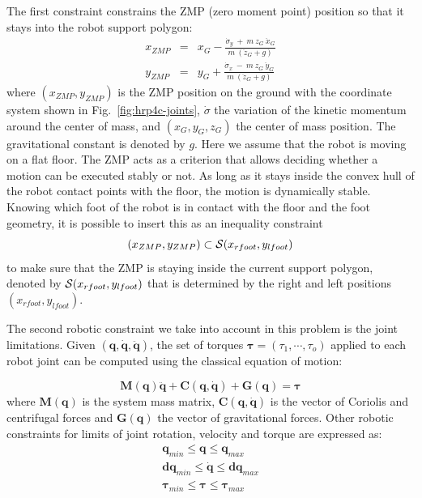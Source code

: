 \documentclass[letterpaper, 10 pt, conference]{ieeeconf}  %
\begin{document}
The first constraint constrains the ZMP (zero moment point) position
so that it stays into the robot support polygon:
\begin{equation}
  \begin{array}{ccc}
    x_{ZMP} &=& x_G - \frac{\dot{\sigma}_y\ +\ m\ z_G\ \ddot{x}_G}{m\ (\ddot{z}_G + g)} \\
    y_{ZMP} &=& y_G + \frac{\dot{\sigma}_x\ -\ m\ z_G\ \ddot{y}_G}{m\ (\ddot{z}_G + g)}
    \end{array}
\label{eq:zmp}
\end{equation}
where $(x_{ZMP}, y_{ZMP})$ is the ZMP position on the
ground with the coordinate system shown in Fig.~\ref{fig:hrp4c-joints}, 
$\dot{\sigma}$ the variation of the kinetic momentum around
the center of mass, and $(x_G, y_G, z_G)$ the center of mass
position. The gravitational constant is denoted by $g$.
Here we assume that the robot is moving on a flat floor.
The ZMP acts as a criterion that allows deciding whether a motion can be
executed stably or not. As long as it stays inside the convex hull of the
robot contact points with the floor, the motion is dynamically stable.
Knowing which foot of the robot is in contact with the floor and the
foot geometry, it is possible to insert this  as an
inequality constraint
\begin{equation}
  (x_{ZMP}, y_{ZMP}) \subset {\cal S}(x_{rfoot}, y_{lfoot})
  \label{eq:support}
\end{equation}
to make sure that the ZMP is staying inside the current support
polygon, denoted by ${\cal S}(x_{rfoot}, y_{lfoot})$ that is
determined by the right and left positions $(x_{rfoot}, y_{lfoot})$. 

The second robotic constraint we take into account in this problem
is the joint limitations. Given $(\mathbf{q}, \dot{\mathbf{q}},
\ddot{\mathbf{q}})$, %
the set of torques  $\mathbf{\tau} = (\tau_1, \cdots, \tau_o)$
applied to each robot joint can be computed using the classical
equation of motion: 

\begin{equation}
  \mathbf{M}(\mathbf{q}) \ddot{\mathbf{q}} + \mathbf{C}(\mathbf{q},
  \dot{\mathbf{q}}) + \mathbf{G}(\mathbf{q}) = \mathbf{\tau}
\end{equation}
where $\mathbf{M}(\mathbf{q})$ is the system mass matrix,
$\mathbf{C}(\mathbf{q}, \dot{\mathbf{q}})$ is the vector of Coriolis
and centrifugal forces and $\mathbf{G}(\mathbf{q})$ the vector of
gravitational forces.
Other robotic constraints for limits of joint rotation, velocity and
torque are expressed as:
\begin{equation}
  \begin{array}{ccc}
    \mathbf{q}_{min} \leq \mathbf{q} \leq \mathbf{q}_{max} \\
    \mathbf{dq}_{min} \leq \dot{\mathbf{q}} \leq \mathbf{dq}_{max} \\
    \mathbf{\tau}_{min} \leq \mathbf{\tau} \leq \mathbf{\tau}_{max} \\
    \end{array}
\end{equation}
\end{document}
